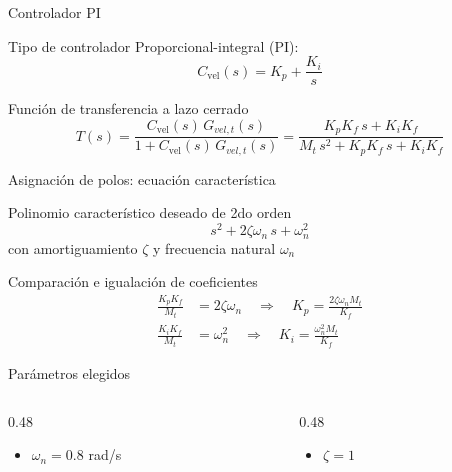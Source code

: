 \begin{frame}{Controlador PI}
  \begin{block}{Tipo de controlador}
    Proporcional-integral (PI):
    \[
    C_{\text{vel}}(s) = K_p + \frac{K_i}{s}
    \]
  \end{block}

  \begin{block}{Función de transferencia a lazo cerrado}
    \[
    T(s) = \frac{C_{\text{vel}}(s) \, G_{vel,t}(s)}{1 + C_{\text{vel}}(s) \, G_{vel,t}(s)} = \frac{K_p K_f\,s + K_i K_f}{M_t\,s^2 + K_p K_f\,s + K_i K_f}
    \]
  \end{block}
\end{frame}

\begin{frame}{Asignación de polos: ecuación característica}
  \begin{block}{Polinomio característico deseado de 2do orden}
    \[
    s^2 + 2\zeta\omega_n\,s + \omega_n^2
    \]
    con amortiguamiento $\zeta$ y frecuencia natural $\omega_n$
  \end{block}

  \begin{block}{Comparación e igualación de coeficientes}
    \begin{align*}
      \frac{K_p K_f}{M_t} &= 2\zeta\omega_n \quad \Rightarrow \quad K_p = \frac{2\zeta\omega_n M_t}{K_f} \\[4pt]
      \frac{K_i K_f}{M_t} &= \omega_n^2 \quad \Rightarrow \quad K_i = \frac{\omega_n^2 M_t}{K_f}
    \end{align*}
  \end{block}
  \begin{block}{Parámetros elegidos}
    \vspace{0.2cm}
    \begin{columns}[T]
      \begin{column}{0.48\textwidth}
        \begin{itemize}
          \item $\omega_n = 0.8$ rad/s
        \end{itemize}
      \end{column}
      \begin{column}{0.48\textwidth}
        \begin{itemize}
          \item $\zeta = 1$
        \end{itemize}
      \end{column}
    \end{columns}
  \end{block}
\end{frame}

